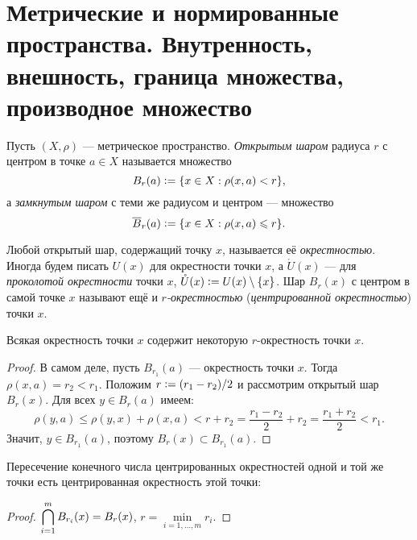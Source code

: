 \section{Метрические и нормированные пространства. Внутренность, внешность, граница множества, производное множество}

\begin{definition}
    Пусть $(X, \rho)$ --- метрическое пространство. \textit{Открытым шаром} радиуса $r$ с центром в точке $a \in X$ называется множество
    \[
        B_r(a) \vcentcolon = \{x \in X : \rho(x, a) < r\},
    \]
    а \textit{замкнутым шаром} с теми же радиусом и центром --- множество
    \[
        \overline{B}_r(a) \vcentcolon = \{x \in X : \rho(x, a) \leqslant r\}.
    \]
\end{definition}

\begin{definition}
    Любой открытый шар, содержащий точку $x$, называется её \textit{окрестностью}. Иногда будем писать $U(x)$ для окрестности точки $x$, а $\mathring{U}(x)$ --- для \textit{проколотой окрестности} точки $x$, $\mathring{U}(x) \vcentcolon = U(x) \setminus \{x\}$. Шар $B_r(x)$ с центром в самой точке $x$ называют ещё и \textit{$r$-окрестностью} (\textit{центрированной окрестностью}) точки $x$.
\end{definition}

\begin{proposal}
    Всякая окрестность точки $x$ содержит некоторую $r$-окрестность точки $x$.
\end{proposal}

\begin{proof}
    В самом деле, пусть $B_{r_1}(a)$ --- окрестность точки $x$. Тогда $\rho(x, a) = r_2 < r_1$. Положим $r \vcentcolon = (r_1 - r_2) / 2$ и рассмотрим открытый шар $B_r(x)$. Для всех $y \in B_r(a)$ имеем:
    \[
        \rho(y, a) \leqslant \rho(y, x) + \rho(x, a) < r + r_2 = \frac{r_1 - r_2}{2} + r_2 = \frac{r_1 + r_2}{2} < r_1.
    \]
    Значит, $y \in B_{r_1}(a)$, поэтому $B_r(x) \subset B_{r_1}(a)$.
\end{proof}

\begin{proposal}
    Пересечение конечного числа центрированных окрестностей одной и той же точки есть центрированная окрестность этой точки:
\end{proposal}

\begin{proof}
    $\displaystyle\bigcap_{i = 1}^mB_{r_i}(x) = B_r(x)$, $r = \min\limits_{i = 1, \ldots, m}r_i$.
\end{proof}

